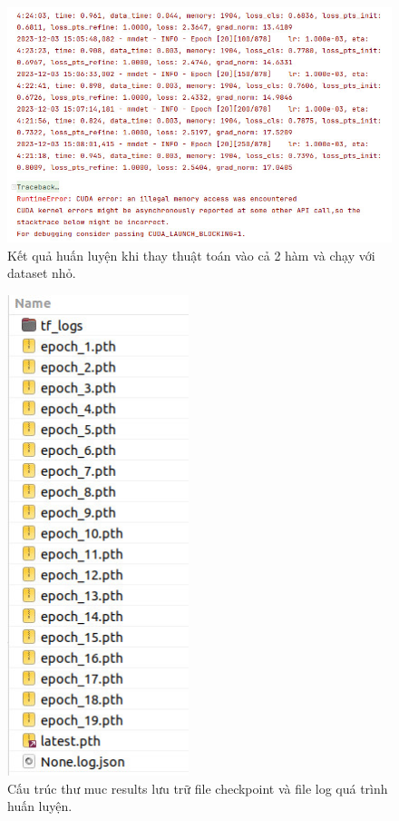 \documentclass[12pt,a4paper,openany,oneside]{report}
\begin{document}
\begin{figure}[ht!]
	\begin{center}
		\includegraphics[width=450px]{./mmrotate8_1000p_epoch20.JPG}
		\caption{Kết quả huấn luyện khi thay thuật toán vào cả 2 hàm và chạy với dataset nhỏ.}
		\label{mmrotate8_1000p_epoch20}
	\end{center}
\end{figure} 

\begin{figure}[ht!]
	\begin{center}
		\includegraphics[width=200px]{./cau_truc_thu_muc_result.JPG}
		\caption{Cấu trúc thư muc results lưu trữ file checkpoint và file log quá trình huấn luyện.}
		\label{cau_truc_thu_muc_result}
	\end{center}
\end{figure} 
\end{document}
